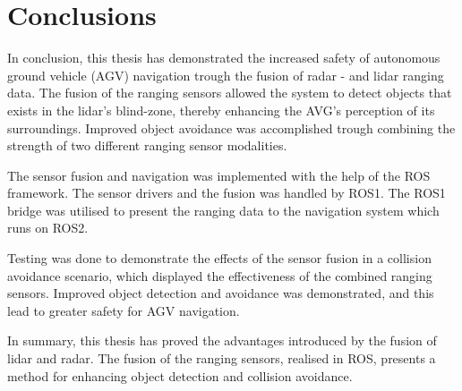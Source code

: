 \chapter{Conclusions}\label{chap:Conclusions}
In conclusion, this thesis has demonstrated the increased safety of autonomous ground vehicle (AGV) navigation trough the fusion of radar - and lidar ranging data. The fusion of the ranging sensors allowed the system to detect objects that exists in the lidar's blind-zone, thereby enhancing the AVG's perception of its surroundings. Improved object avoidance was accomplished trough combining the strength of two different ranging sensor modalities.

The sensor fusion and navigation was implemented with the help of the ROS framework. The sensor drivers and the fusion was handled by ROS1. The ROS1 bridge was utilised to present the ranging data to the navigation system which runs on ROS2.

Testing was done to demonstrate the effects of the sensor fusion in a collision avoidance scenario, which displayed the effectiveness of the combined ranging sensors. Improved object detection and avoidance was demonstrated, and this lead to greater safety for AGV navigation. 

In summary, this thesis has proved the advantages introduced by the fusion of lidar and radar. The fusion of the ranging sensors, realised in ROS, presents a method for enhancing object detection and collision avoidance. 